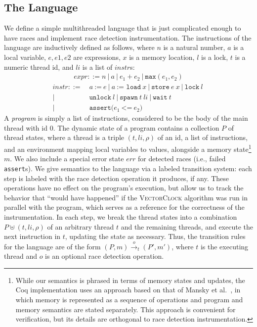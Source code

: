 \documentclass[preprint, 10pt]{sigplanconf}
\newcommand{\VCalg}{\textsc{VectorClock}\xspace}
\newcommand{\assign}[2]{#1\ \texttt{:=}\ #2}
\newcommand{\load}[2]{#1\ \texttt{:= load}\ #2}
\newcommand{\store}[2]{\texttt{store}\ #2\ #1}
\newcommand{\lock}[1]{\texttt{lock}\ #1}
\newcommand{\unlock}[1]{\texttt{unlock}\ #1}
\newcommand{\spawn}[2]{\texttt{spawn}\ #1\ #2}
\newcommand{\wait}[1]{\texttt{wait}\ #1}
\newcommand{\assert}[2]{\texttt{assert(}#1\ \texttt{<=}\ #2\texttt{)}}
\newcommand{\cfg}[2]{\ensuremath{(#1, #2)}}
\newcommand{\anarrow}[2]{\ensuremath{\xrightarrow{#2}_{#1}}}
\newcommand{\exec}[5]{\ensuremath{\cfg{#1}{#2} \anarrow{#3}{#4} #5}}
\begin{document}
\subsection{The Language}
We define a simple multithreaded language that is just complicated enough to have races and implement race detection instrumentation. The instructions of the language are inductively defined as follows, where $n$ is a natural number, $a$ is a local variable, $e, e1, e2$ are expressions, $x$ is a memory location, $l$ is a lock, $t$ is a numeric thread id, and $\mathit{li}$ is a list of $\mathit{instr}$s:
\begin{align*}\mathit{expr} ::= n~|~a~|~e_1 + e_2~|~\mathtt{max}(e_1, e_2)\end{align*}
\begin{align*}\mathit{instr} ::=\ &\assign{a}{e}~|~\load{a}{x}~|~\store{x}{e}~|~\lock{l}~\\|~&\unlock{l}~|~\spawn{t}{\mathit{li}}~|~\wait{t}~\\|~&\assert{e_1}{e_2}\end{align*}
A \emph{program} is simply a list of instructions, considered to be the body of the main thread with id $0$. The dynamic state of a program contains a collection $P$ of thread states, where a thread is a triple $(t, \mathit{li}, \rho)$ of an id, a list of instructions, and an environment mapping local variables to values, alongside a memory state\footnote{While our semantics is phrased in terms of memory states and updates, the Coq implementation uses an approach based on that of Mansky et al.~\cite{memspec}, in which memory is represented as a sequence of operations and program and memory semantics are stated separately. This approach is convenient for verification, but its details are orthogonal to race detection instrumentation.} $m$. We also include a special error state $\mathit{err}$ for detected races (i.e., failed \texttt{assert}s). We give semantics to the language via a labeled transition system: each step is labeled with the race detection operation it produces, if any. These operations have no effect on the program's execution, but allow us to track the behavior that ``would have happened'' if the \VCalg algorithm was run in parallel with the program, which serves as a reference for the correctness of the instrumentation. In each step, we break the thread states into a combination $P \uplus (t, \mathit{li}, \rho)$ of an arbitrary thread $t$ and the remaining threads, and execute the next instruction in $t$, updating the state as necessary. Thus, the transition rules for the language are of the form \exec{P}{m}{t}{o}{(P', m')}, where $t$ is the executing thread and $o$ is an optional race detection operation. 
\end{document}
